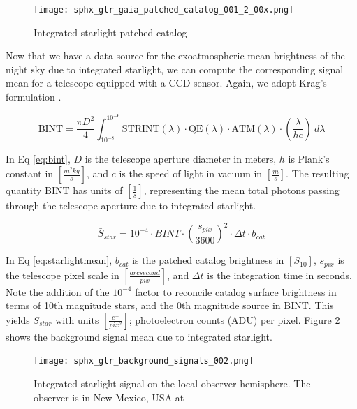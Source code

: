 \begin{figure}[ht]
  \centering
  \texttt{[image: sphx\_glr\_gaia\_patched\_catalog\_001\_2\_00x.png]}
  \caption{Integrated starlight patched catalog}
  \label{fig:gaiapatched}
\end{figure}

Now that we have a data source for the exoatmospheric mean brightness of the night sky due to integrated
starlight, we can compute the corresponding signal mean for a telescope equipped with a CCD sensor.
Again, we adopt Krag's formulation \cite{krag2003}.

\begin{equation} \label{eq:bint}
 \textrm{BINT} = \frac{\pi D^2}{4}
  \int_{10^{-8}}^{10^{-6}}{ \textrm{STRINT}(\lambda) \cdot \textrm{QE}(\lambda) \cdot \textrm{ATM}(\lambda)
  \cdot \left( \frac{\lambda}{h c} \right) \: d\lambda}  
\end{equation}

In Eq \ref{eq:bint}, $D$ is the telescope aperture diameter in meters, $h$ is Plank's constant in
$\left[ \frac{m^2 kg}{s} \right]$, and $c$
is the speed of light in vacuum in $\left[ \frac{m}{s} \right]$. The resulting quantity
$\textrm{BINT}$ has units of $\left[ \frac{1}{s} \right]$, representing the mean total photons passing
through the telescope aperture due to integrated starlight. 

\begin{equation} \label{eq:starlightmean}
  \bar{S}_{star} = 10^{-4} \cdot BINT \cdot \left( \frac{s_{pix}}{3600} \right)^2 \cdot \Delta t \cdot
  b_{cat}
\end{equation}

In Eq \ref{eq:starlightmean}, $b_{cat}$ is the patched catalog brightness in $\left[ S_{10}
\right]$, $s_{pix}$ is the telescope pixel scale in $\left[ \frac{arcsecond}{pix} \right]$, and $\Delta t$ is the integration time in seconds. Note the addition of the $10^{-4}$ factor to reconcile catalog surface brightness in terms of 10th magnitude stars, and the 0th magnitude source in $\textrm{BINT}$. This yields $\bar{S}_{star}$ with units $\left[ \frac{e^-}{pix^2} \right]$; photoelectron counts (ADU) per pixel. Figure \ref{fig:starlight_hemi} shows the background signal mean due to integrated starlight.

\begin{figure}[ht]
  \centering
  \texttt{[image: sphx\_glr\_background\_signals\_002.png]}
  \caption{Integrated starlight signal on the local observer hemisphere. The observer is in New Mexico, USA at
  \pogslla}
  \label{fig:starlight_hemi}
\end{figure}

